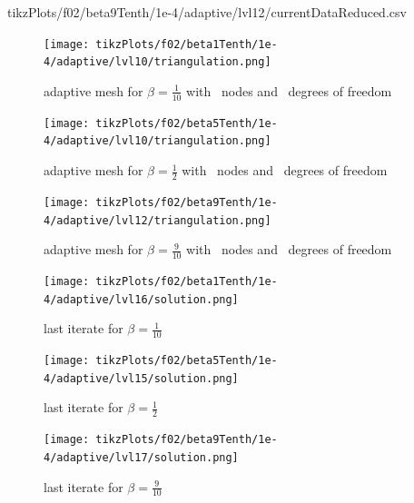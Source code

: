 \documentclass[draft=false,twoside,12pt]{scrreprt}
\begin{document}
  {tikzPlots/f02/beta9Tenth/1e-4/adaptive/lvl12/currentDataReduced.csv}

\vspace{-\parskip}
\begin{minipage}[t]{0.3\textwidth}
  \begin{figure}[H]
	  \centering
    \texttt{[image: tikzPlots/f02/beta1Tenth/1e-4/adaptive/lvl10/triangulation.png]}
    \caption{adaptive mesh for $\beta=\frac{1}{10}$ with
    \nrNodes\ nodes and \nrDof\ degrees of freedom}
  \end{figure}
\end{minipage}
\hfill
\vline
\hfill
\begin{minipage}[t]{0.3\textwidth}
  \begin{figure}[H]
	  \centering
    \texttt{[image: tikzPlots/f02/beta5Tenth/1e-4/adaptive/lvl10/triangulation.png]}
    \caption{adaptive mesh for $\beta=\frac{1}{2}$ with
    \nrNodesAlt\ nodes and \nrDofAlt\ degrees of freedom}
  \end{figure}
\end{minipage}
\hfill
\vline
\hfill
\begin{minipage}[t]{0.3\textwidth}
  \begin{figure}[H]
	  \centering
    \texttt{[image: tikzPlots/f02/beta9Tenth/1e-4/adaptive/lvl12/triangulation.png]}
    \caption{adaptive mesh for $\beta=\frac{9}{10}$ with
    \ nodes and \ degrees of freedom}
  \end{figure}
\end{minipage}


\vspace{-\parskip}
\begin{minipage}[t]{0.3\textwidth}
  \begin{figure}[H]
	  \centering
		\texttt{[image: tikzPlots/f02/beta1Tenth/1e-4/adaptive/lvl16/solution.png]} 
      \caption{last iterate for $\beta=\frac{1}{10}$}
  \end{figure}
\end{minipage}
\hfill
\vline
\hfill
\begin{minipage}[t]{0.3\textwidth}
  \begin{figure}[H]
	  \centering
		\texttt{[image: tikzPlots/f02/beta5Tenth/1e-4/adaptive/lvl15/solution.png]} 
      \caption{last iterate for $\beta=\frac{1}{2}$}
  \end{figure}
\end{minipage}
\hfill
\vline
\hfill
\begin{minipage}[t]{0.3\textwidth}
  \begin{figure}[H]
	  \centering
		\texttt{[image: tikzPlots/f02/beta9Tenth/1e-4/adaptive/lvl17/solution.png]} 
      \caption{last iterate for $\beta=\frac{9}{10}$}
  \end{figure}
\end{minipage}
\end{document}
